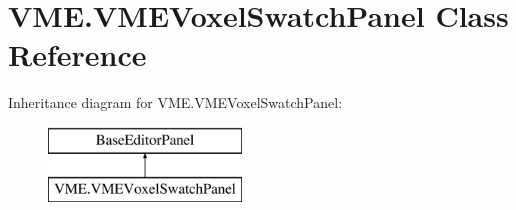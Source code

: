 \hypertarget{class_v_m_e_1_1_v_m_e_voxel_swatch_panel}{}\section{V\+M\+E.\+V\+M\+E\+Voxel\+Swatch\+Panel Class Reference}
\label{class_v_m_e_1_1_v_m_e_voxel_swatch_panel}
Inheritance diagram for V\+M\+E.\+V\+M\+E\+Voxel\+Swatch\+Panel\+:\begin{figure}[H]
\begin{center}
\leavevmode
\includegraphics[height=2.000000cm]{class_v_m_e_1_1_v_m_e_voxel_swatch_panel}
\end{center}
\end{figure}
